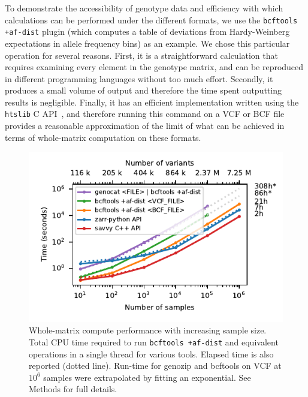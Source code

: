 \documentclass[a4paper,num-refs]{oup-contemporary}
\begin{document}
To demonstrate the accessibility of genotype data and efficiency with 
which calculations can be performed under the different formats,
we use the \texttt{bcftools +af-dist} plugin
(which computes a table of
deviations from Hardy-Weinberg expectations in 
allele frequency bins) as an example.
We chose this particular operation for several reasons. 
First, it is a straightforward calculation that 
requires examining every element in the genotype matrix,
and can be reproduced in different programming languages
without too much effort.
Secondly, it produces a small volume of output  and therefore the 
time spent outputting results is negligible.
Finally, it has an efficient implementation written using the 
\texttt{htslib} C API~\citep{bonfield2021htslib},
and therefore running this command on a VCF or BCF file provides 
a reasonable approximation of the limit of what can be achieved in terms 
of whole-matrix computation on these formats.

\begin{figure}
\includegraphics{figures/whole-matrix-compute}
\caption{Whole-matrix compute performance with increasing sample size.
Total CPU time required to run \texttt{bcftools +af-dist}
and equivalent operations in a single thread for various tools.
Elapsed time is also reported (dotted line). Run-time for genozip
and bcftools on VCF
at $10^6$ samples were extrapolated by fitting an exponential.
See Methods for full details.
\label{fig-whole-matrix-compute}}
\end{figure}
\end{document}
